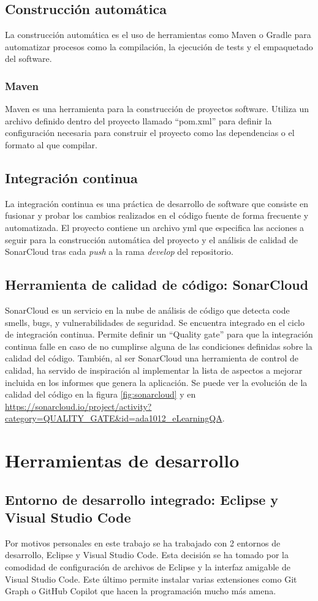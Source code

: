\subsection{Construcción automática}
La construcción automática es el uso de herramientas como Maven o Gradle para automatizar procesos como la compilación, la ejecución de tests y el empaquetado del software.
\subsubsection{Maven}
Maven es una herramienta para la construcción de proyectos software. Utiliza un archivo definido dentro del proyecto llamado ``pom.xml'' para definir la configuración necesaria para construir el proyecto como las dependencias o el formato al que compilar.
\subsection{Integración continua}
La integración continua  es una práctica de desarrollo de software que consiste en fusionar y probar los cambios realizados en el código fuente de forma frecuente y automatizada. 
El proyecto contiene un archivo yml que especifica las acciones a seguir para la construcción automática del proyecto y el análisis de calidad de SonarCloud tras cada \textit{push} a la rama \textit{develop} del repositorio.
\subsection{Herramienta de calidad de código: SonarCloud}
SonarCloud es un servicio en la nube de análisis de código que detecta code smells, bugs, y vulnerabilidades de seguridad. Se encuentra integrado en el ciclo de integración continua. Permite definir un ``Quality gate'' para que la integración continua falle en caso de no cumplirse alguna de las condiciones definidas sobre la calidad del código.
También, al ser SonarCloud una herramienta de control de calidad, ha servido de inspiración al implementar la lista de aspectos a mejorar incluida en los informes que genera la aplicación.
Se puede ver la evolución de la calidad del código en la figura \ref{fig:sonarcloud} y en \url{https://sonarcloud.io/project/activity?category=QUALITY_GATE&id=ada1012_eLearningQA}.

\section{Herramientas de desarrollo}
\subsection{Entorno de desarrollo integrado: Eclipse y Visual Studio Code}
Por motivos personales en este trabajo se ha trabajado con 2 entornos de desarrollo, Eclipse y Visual Studio Code. Esta decisión se ha tomado por la comodidad de configuración de archivos de Eclipse y la interfaz amigable de Visual Studio Code. Este último permite instalar varias extensiones como Git Graph o GitHub Copilot que hacen la programación mucho más amena.
